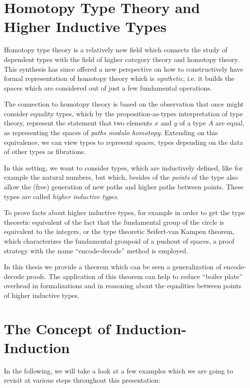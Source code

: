 \section{Homotopy Type Theory and Higher Inductive Types}

Homotopy type theory is a relatively new field which connects the study of
dependent types with the field of higher category theory and homotopy theory.
This synthesis has since offered a new perspective on how to constructively
have formal representation of homotopy theory which is \emph{synthetic},
i.e. it builds the spaces which are considered out of just a few fundamental
operations.

The connection to homotopy theory is based on the observation that once might
consider equality types, which by the proposition-as-types interpretation of type
theory, represent the statement that two elements $x$ and $y$ of a type $A$
are equal, as representing the spaces of \emph{paths modulo homotopy}.
Extending on this equivalence, we can view types to represent spaces,
types depending on the data of other types as fibrations.

In this setting, we want to consider types, which are inductively defined,
like for example the natural numbers, but which, besides of the \emph{points}
of the type also allow the (free) generation of new paths and higher paths between
points.
These types are called \emph{higher inductive types}.

To prove facts about higher inductive types, for example in order to get the
type theoretic equivalent of the fact that the fundamental group of the circle
is equivalent to the integers, or the type theoretic Seifert-van Kampen theorem,
which characterizes the fundamental groupoid of a pushout of spaces,
a proof strategy with the name ``encode-decode'' method is employed.

In this thesis we provide a theorem which can be seen a generalization of
encode-decode proofs.
The application of this theorem can help to reduce ``boiler plate'' overhead
in formalizations and in reasoning about the equalities between points
of higher inductive types.

\section{The Concept of Induction-Induction}

In the following, we will take a look at a few examples which we are going to
revisit at various steps throughout this presentation:


